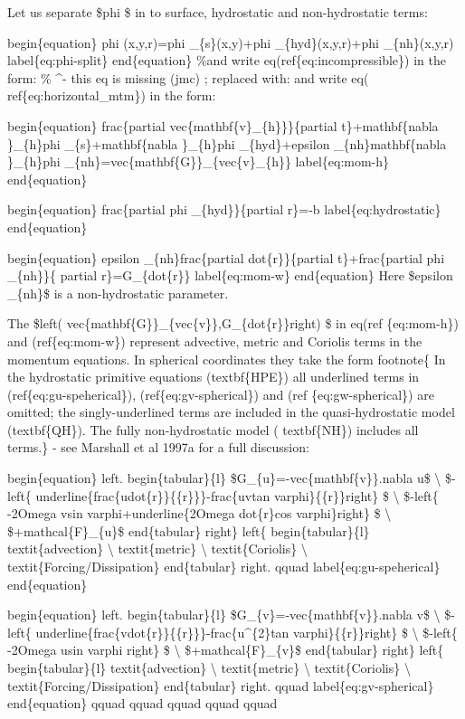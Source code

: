 \documentclass[letterpaper,10pt,english]{sphinxmanual}
\begin{document}
Let us separate \$phi \$ in to surface, hydrostatic and non-hydrostatic terms:

begin\{equation\}
phi (x,y,r)=phi \_\{s\}(x,y)+phi \_\{hyd\}(x,y,r)+phi \_\{nh\}(x,y,r)
label\{eq:phi-split\}
end\{equation\}
\%and write eq(ref\{eq:incompressible\}) in the form:
\%                  \textasciicircum{}- this eq is missing (jmc) ; replaced with:
and write eq( ref\{eq:horizontal\_mtm\}) in the form:

begin\{equation\}
frac\{partial vec\{mathbf\{v\}\_\{h\}\}\}\{partial t\}+mathbf\{nabla \}\_\{h\}phi
\_\{s\}+mathbf\{nabla \}\_\{h\}phi \_\{hyd\}+epsilon \_\{nh\}mathbf\{nabla \}\_\{h\}phi
\_\{nh\}=vec\{mathbf\{G\}\}\_\{vec\{v\}\_\{h\}\}  label\{eq:mom-h\}
end\{equation\}

begin\{equation\}
frac\{partial phi \_\{hyd\}\}\{partial r\}=-b  label\{eq:hydrostatic\}
end\{equation\}

begin\{equation\}
epsilon \_\{nh\}frac\{partial dot\{r\}\}\{partial t\}+frac\{partial phi \_\{nh\}\}\{
partial r\}=G\_\{dot\{r\}\}  label\{eq:mom-w\}
end\{equation\}
Here \$epsilon \_\{nh\}\$ is a non-hydrostatic parameter.

The \$left( vec\{mathbf\{G\}\}\_\{vec\{v\}\},G\_\{dot\{r\}\}right) \$ in eq(ref
\{eq:mom-h\}) and (ref\{eq:mom-w\}) represent advective, metric and Coriolis
terms in the momentum equations. In spherical coordinates they take the form
footnote\{
In the hydrostatic primitive equations (textbf\{HPE\}) all underlined terms
in (ref\{eq:gu-speherical\}), (ref\{eq:gv-spherical\}) and (ref
\{eq:gw-spherical\}) are omitted; the singly-underlined terms are included in
the quasi-hydrostatic model (textbf\{QH\}). The fully non-hydrostatic model (
textbf\{NH\}) includes all terms.\} - see Marshall et al 1997a for a full
discussion:

begin\{equation\}
left.
begin\{tabular\}\{l\}
\$G\_\{u\}=-vec\{mathbf\{v\}\}.nabla u\$ \textbackslash{}
\$-left\{ underline\{frac\{udot\{r\}\}\{\{r\}\}\}-frac\{uvtan varphi\}\{\{r\}\}right\} \$
\textbackslash{}
\$-left\{ -2Omega vsin varphi+underline\{2Omega dot\{r\}cos varphi\}right\} \$
\textbackslash{}
\$+mathcal\{F\}\_\{u\}\$
end\{tabular\}
right\} left\{
begin\{tabular\}\{l\}
textit\{advection\} \textbackslash{}
textit\{metric\} \textbackslash{}
textit\{Coriolis\} \textbackslash{}
textit\{Forcing/Dissipation\}
end\{tabular\}
right. qquad  label\{eq:gu-speherical\}
end\{equation\}

begin\{equation\}
left.
begin\{tabular\}\{l\}
\$G\_\{v\}=-vec\{mathbf\{v\}\}.nabla v\$ \textbackslash{}
\$-left\{ underline\{frac\{vdot\{r\}\}\{\{r\}\}\}-frac\{u\textasciicircum{}\{2\}tan varphi\}\{\{r\}\}right\}
\$ \textbackslash{}
\$-left\{ -2Omega usin varphi right\} \$ \textbackslash{}
\$+mathcal\{F\}\_\{v\}\$
end\{tabular\}
right\} left\{
begin\{tabular\}\{l\}
textit\{advection\} \textbackslash{}
textit\{metric\} \textbackslash{}
textit\{Coriolis\} \textbackslash{}
textit\{Forcing/Dissipation\}
end\{tabular\}
right. qquad  label\{eq:gv-spherical\}
end\{equation\}
qquad qquad qquad qquad qquad
\end{document}
